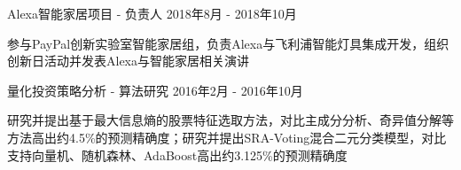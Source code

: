 \documentclass[11pt, a4paper, UTF8]{awesome-cv}
\begin{document}
%
\begin{cventries}
  \cventry
    {Alexa智能家居项目 - 负责人} %
    {} %
    {} %
    {2018年8月 - 2018年10月} %
    {
      \begin{cvitems} %
        \item {参与PayPal创新实验室智能家居组，负责Alexa与飞利浦智能灯具集成开发，组织创新日活动并发表Alexa与智能家居相关演讲}
      \end{cvitems}
    }

  \cventry
    {量化投资策略分析 - 算法研究} %
    {} %
    {} %
    {2016年2月 - 2016年10月} %
    {
      \begin{cvitems} %
        \item {研究并提出基于最大信息熵的股票特征选取方法，对比主成分分析、奇异值分解等方法高出约4.5\%的预测精确度；研究并提出SRA-Voting混合二元分类模型，对比支持向量机、随机森林、AdaBoost高出约3.125\%的预测精确度}
      \end{cvitems}
    }
    
    
\end{cventries}
\end{document}

